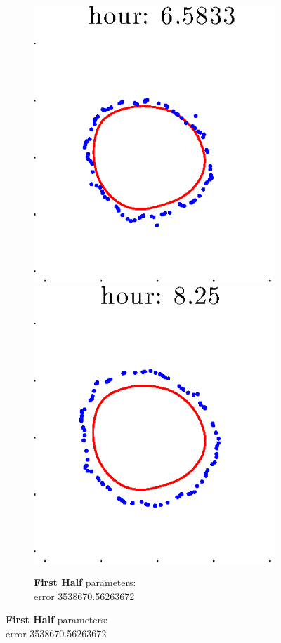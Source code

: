 \documentclass[12pt]{article}
\begin{document}
\begin{figure}[h!]
\begin{subfigure}[b]{.3\textwidth}
		\includegraphics[height=.15\textheight]{Pos5exp2/full/first5.eps}
		\includegraphics[height=.15\textheight]{Pos5exp2/full/first6.eps}
		\caption{\textbf{First Half} parameters: \\error 3538670.56263672}

\end{subfigure}
\end{figure}
\end{document}
